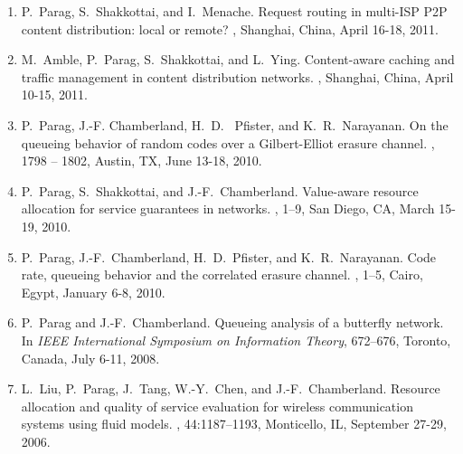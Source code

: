 \documentclass[11pt]{article}
\begin{document}
\begin{enumerate}
\item [{\bf [C8]}] P.~Parag, S.~Shakkottai, and I.~Menache.
\newblock Request routing in multi-ISP P2P content distribution: local or remote?
, Shanghai, China, April 16-18, 
	2011.

\item [{\bf [C7]}] M.~Amble, P.~Parag, S.~Shakkottai, and L.~Ying.
\newblock Content-aware caching and traffic management in content distribution networks.  
, Shanghai, China, April 10-15, 
	2011. 
	
\item [{\bf [C6]}] P.~Parag, J.-F. Chamberland, H.~D.~ Pfister, and K.~R.~Narayanan.
\newblock On the queueing behavior of random codes over a Gilbert-Elliot erasure channel.
, 1798 -- 1802,  
	Austin, TX, June 13-18, 2010. 
  	
\item [{\bf [C5]}] P.~Parag, S.~Shakkottai, and J.-F.~Chamberland.
\newblock Value-aware resource allocation for service guarantees in networks.
, 1--9, 
	San Diego, CA, March 15-19, 2010. 

\item [{\bf [C4]}] P.~Parag, J.-F.~Chamberland, H.~D.~Pfister, and K.~R.~Narayanan.
\newblock Code rate, queueing behavior and the correlated erasure channel.
, 1--5,
	Cairo, Egypt, January 6-8, 2010. 
	
\item [{\bf [C3]}] P.~Parag and J.-F.~Chamberland.
\newblock Queueing analysis of a butterfly network.
\newblock In {\em IEEE International Symposium on Information Theory}, 672--676, Toronto,
  Canada, July 6-11, 2008.
  
\item [{\bf [C2]}] L.~Liu, P.~Parag, J.~Tang, W.-Y.~Chen, and J.-F.~Chamberland.
\newblock Resource allocation and quality of service evaluation for wireless
  communication systems using fluid models.
, 44:1187--1193, Monticello, IL, September 27-29, 
  2006. 


\end{enumerate}
\end{document}
